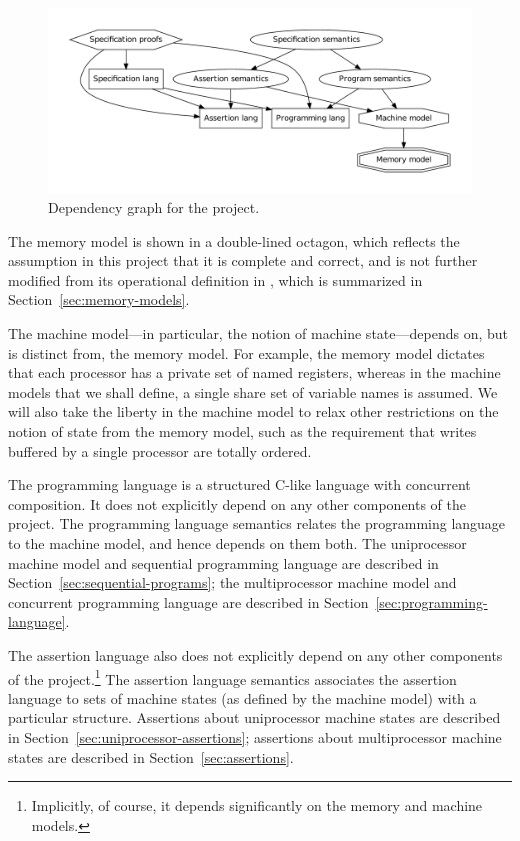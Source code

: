 \documentclass[11pt]{report}
\begin{document}
\begin{figure}[ht]
\includegraphics[scale=0.5]{dependency-graph/dg-reduced}
\caption{\label{fig:dependency-graph}Dependency graph for the project.}
\end{figure}

The memory model is shown in a double-lined octagon, which reflects the assumption in this project that it is complete and correct, and is not further modified from its operational definition in \cite{DBLP:conf/tphol/OwensSS09}, which is summarized in Section~\ref{sec:memory-models}. 

The machine model---in particular, the notion of machine state---depends on, but is distinct from, the memory model. For example, the memory model dictates that each processor has a private set of named registers, whereas in the machine models that we shall define, a single share set of variable names is assumed. We will also take the liberty in the machine model to relax other restrictions on the notion of state from the memory model, such as the requirement that writes buffered by a single processor are totally ordered. 

The programming language is a structured C-like language with concurrent composition. It does not explicitly depend on any other components of the project. The programming language semantics relates the programming language to the machine model, and hence depends on them both. The uniprocessor machine model and sequential programming language are described in Section~\ref{sec:sequential-programs}; the multiprocessor machine model and concurrent programming language are described in Section~\ref{sec:programming-language}. 

The assertion language also does not explicitly depend on any other components of the project.\footnote{Implicitly, of course, it depends significantly on the memory and machine models.} The assertion language semantics associates the assertion language to sets of machine states (as defined by the machine model) with a particular structure. Assertions about uniprocessor machine states are described in Section~\ref{sec:uniprocessor-assertions}; assertions about multiprocessor machine states are described in Section~\ref{sec:assertions}. 
\end{document}
